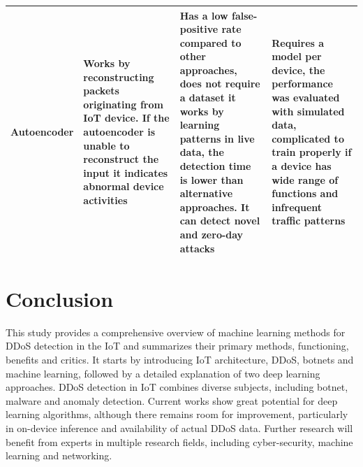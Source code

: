 \documentclass[conference, 11pt]{IEEEtran}
\begin{document}
\begin{table}[htbp]
\begin{center}
\begin{tabularx}{\linewidth}{|l|X|X|X|}
                \hline
                Autoencoder \cite{article:4}                                        & Works by reconstructing packets originating from IoT device. If the autoencoder is unable to reconstruct the input it indicates abnormal device activities & Has a low false-positive rate compared to other approaches, does not require a dataset it works by learning patterns in live data, the detection time is lower than alternative approaches. It can detect novel and zero-day attacks    & Requires a model per device, the performance was evaluated with simulated data, complicated to train properly if a device has wide range of functions and infrequent traffic patterns                      \\
                \hline
            \end{tabularx}
            \label{tab1}
        \end{center}
    \end{table}


    \section{Conclusion}
    This study provides a comprehensive overview of machine learning methods for DDoS detection in the IoT and summarizes their primary methods, functioning, benefits and critics.
    It starts by introducing IoT architecture, DDoS, botnets and machine learning, followed by a detailed explanation of two deep learning approaches.
    DDoS detection in IoT combines diverse subjects, including botnet, malware and anomaly detection.
    Current works show great potential for deep learning algorithms, although there remains room for improvement, particularly in on-device inference and availability of actual DDoS data.
    Further research will benefit from experts in multiple research fields, including cyber-security, machine learning and networking.


    
    
\end{document}
